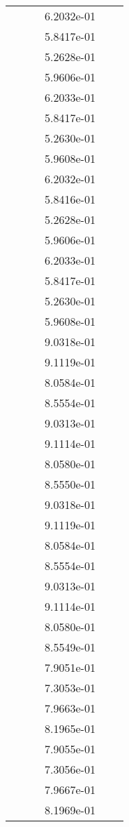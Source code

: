 \begin{xltabular}{\textwidth}{r|rS[table-format=1.3e+2]S[table-format=1.4e+2]S[table-format=1.4e+2]S[table-format=-1.5]}
&  &  & 6.2032e-01 & & \\
&  &  & 5.8417e-01 & & \\
&  &  & 5.2628e-01 & & \\
&  &  & 5.9606e-01 & & \\
&  &  & 6.2033e-01 & & \\
&  &  & 5.8417e-01 & & \\
&  &  & 5.2630e-01 & & \\
&  &  & 5.9608e-01 & & \\
&  &  & 6.2032e-01 & & \\
&  &  & 5.8416e-01 & & \\
&  &  & 5.2628e-01 & & \\
&  &  & 5.9606e-01 & & \\
&  &  & 6.2033e-01 & & \\
&  &  & 5.8417e-01 & & \\
&  &  & 5.2630e-01 & & \\
&  &  & 5.9608e-01 & & \\
&  &  & 9.0318e-01 & & \\
&  &  & 9.1119e-01 & & \\
&  &  & 8.0584e-01 & & \\
&  &  & 8.5554e-01 & & \\
&  &  & 9.0313e-01 & & \\
&  &  & 9.1114e-01 & & \\
&  &  & 8.0580e-01 & & \\
&  &  & 8.5550e-01 & & \\
&  &  & 9.0318e-01 & & \\
&  &  & 9.1119e-01 & & \\
&  &  & 8.0584e-01 & & \\
&  &  & 8.5554e-01 & & \\
&  &  & 9.0313e-01 & & \\
&  &  & 9.1114e-01 & & \\
&  &  & 8.0580e-01 & & \\
&  &  & 8.5549e-01 & & \\
&  &  & 7.9051e-01 & & \\
&  &  & 7.3053e-01 & & \\
&  &  & 7.9663e-01 & & \\
&  &  & 8.1965e-01 & & \\
&  &  & 7.9055e-01 & & \\
&  &  & 7.3056e-01 & & \\
&  &  & 7.9667e-01 & & \\
&  &  & 8.1969e-01 & & \\

\end{xltabular}

